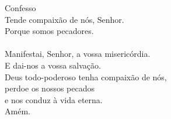 \textcolor{VioletRed1}{Confesso}
\vspace{0.2cm} \\
\VbarRed{} Tende compaixão de nós, Senhor.\\
\RbarRed{} Porque somos pecadores.\\
\vspace{0.1cm} \\
\VbarRed{} Manifestai, Senhor, a vossa misericórdia.\\
\RbarRed{} E dai-nos a vossa salvação.
\vspace{0.1cm} \\
Deus todo-poderoso tenha compaixão de nós, \\
perdoe os nossos pecados \\
e nos conduz à vida eterna. \\
\RbarRed{} Amém.
\vspace{0.2cm} \\
